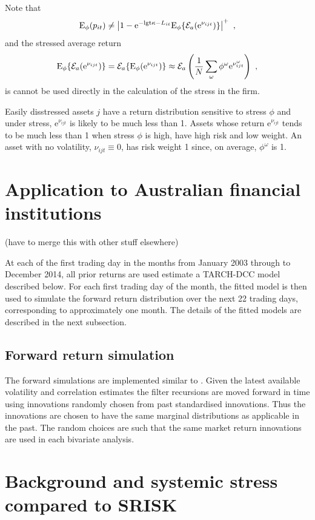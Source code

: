 \documentclass[authoryear]{elsarticle}
\newcommand{\logit}{\mathrm{lgt}}
\newcommand{\E}{\mathrm{E}}
\newcommand{\e}{\mathrm{e}}
\renewcommand{\o}{\omega}
\newcommand{\Ex}{{\cal E}}
\newcommand{\Es}{\E_\phi}
\begin{document}
Note that 
$$
\Es(p_{it}) \ne \left|1-\e^{-\logit\kappa-L_{it}}\Es\{\Ex_a(\e^{\nu_{ijt}})\}\right|^+\ ,
$$
and the stressed average return
$$
\Es\{\Ex_a(\e^{\nu_{ijt}})\} = \Ex_a\{\Es(\e^{\nu_{ijt}})\} \approx \Ex_a\left( \frac{1}{N}\sum_\o\phi^\o\e^{\nu_{ijt}^\o}\right)\ ,
$$
is cannot be used directly in the calculation of the stress in the firm.  

Easily disstressed assets $j$  have a return distribution sensitive to stress $\phi$ and under stress, $\e^{\nu_{ijt}}$ is likely to be much less than 1.  Assets whose return $\e^{\nu_{ijt}}$  tends to be much less than 1 when stress $\phi$ is high,  have high risk and low weight.  An asset with no volatility, $\nu_{ijt}\equiv 0$, has risk weight 1 since, on average, $\phi^\o$ is 1.  

     



\section{Application to Australian financial institutions}

 (have to merge this with other stuff elsewhere)
 
At each of the first trading day in the months from January 2003 through to December 2014,  all prior returns are used estimate a TARCH-DCC model described below.   For each first trading day of the month, the fitted model is then used to simulate the forward return distribution over the next 22 trading days, corresponding to approximately one month.  The details of the fitted models are described in the next subsection.


\subsection{Forward return simulation}

The forward simulations are implemented similar to \cite{brownlees2015}.   Given the latest available volatility and correlation estimates the filter recursions are moved forward in time using innovations randomly chosen from past standardised innovations.  Thus the innovations are chosen to have the same marginal distributions as applicable in the past.  The random choices are such  that the same market return innovations are used in each bivariate analysis.   



\section{Background and systemic stress  compared to SRISK}
\end{document}
